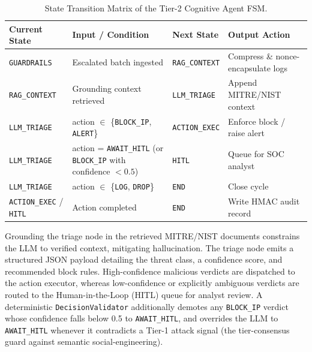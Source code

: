 \begin{table}[H]
    \centering
    \caption{State Transition Matrix of the Tier-2 Cognitive Agent FSM.}
    \label{tab:agent_fsm_transitions}
    \begin{tabular}{|>{\raggedright\arraybackslash}p{}|>{\raggedright\arraybackslash}p{}|>{\raggedright\arraybackslash}p{}|>{\raggedright\arraybackslash}p{}|}
        \hline
        \textbf{Current State} & \textbf{Input / Condition} & \textbf{Next State} & \textbf{Output Action} \\
        \hline
        \texttt{GUARDRAILS} & Escalated batch ingested & \texttt{RAG\_CONTEXT} & Compress \& nonce-encapsulate logs \\
        \hline
        \texttt{RAG\_CONTEXT} & Grounding context retrieved & \texttt{LLM\_TRIAGE} & Append MITRE\slash NIST context \\
        \hline
        \texttt{LLM\_TRIAGE} & action $\in$ \{\texttt{BLOCK\_IP}, \texttt{ALERT}\} & \texttt{ACTION\_EXEC} & Enforce block / raise alert \\
        \hline
        \texttt{LLM\_TRIAGE} & action = \texttt{AWAIT\_HITL} (or \texttt{BLOCK\_IP} with confidence $<0.5$) & \texttt{HITL} & Queue for SOC analyst \\
        \hline
        \texttt{LLM\_TRIAGE} & action $\in$ \{\texttt{LOG}, \texttt{DROP}\} & \texttt{END} & Close cycle \\
        \hline
        \texttt{ACTION\_EXEC} / \texttt{HITL} & Action completed & \texttt{END} & Write HMAC audit record \\
        \hline
    \end{tabular}
\end{table}

Grounding the triage node in the retrieved MITRE/NIST documents constrains the LLM to verified context, mitigating hallucination. The triage node emits a structured JSON payload detailing the threat class, a confidence score, and recommended block rules. High-confidence malicious verdicts are dispatched to the action executor, whereas low-confidence or explicitly ambiguous verdicts are routed to the Human-in-the-Loop (HITL) queue for analyst review. A deterministic \texttt{DecisionValidator} additionally demotes any \texttt{BLOCK\_IP} verdict whose confidence falls below 0.5 to \texttt{AWAIT\_HITL}, and overrides the LLM to \texttt{AWAIT\_HITL} whenever it contradicts a Tier-1 attack signal (the tier-consensus guard against semantic social-engineering).

